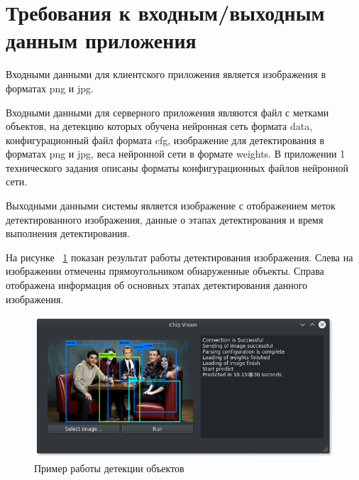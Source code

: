 \documentclass[a4paper,english,russian]{G2-105}
\begin{document}
\section{Требования к входным/выходным данным приложения} \ttl
\par Входными данными для клиентского приложения является изображения в форматах png и jpg.
\par Входными данными для серверного приложения являются файл с метками объектов, на детекцию которых обучена нейронная сеть формата data, конфигурационный файл формата cfg, изображение для детектирования в форматах png и jpg, веса нейронной сети в формате weights. В приложении 1 технического задания описаны форматы конфигурационных файлов нейронной сети.
\par Выходными данными системы является изображение с отображением меток детектированного изображения, данные о этапах детектирования и время выполнения детектирования.
\par На рисунке ~\ref{window} показан результат работы детектирования изображения. Слева на изображении отмечены прямоугольником обнаруженные объекты. Справа отображена информация об основных этапах детектирования данного изображения.
\begin{figure}
    \includegraphics[width=\linewidth]{window.png}
    \caption{Пример работы детекции объектов}
	\label{window}
\end{figure}
\ttl
\end{document}
